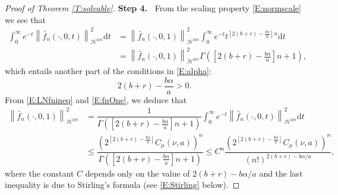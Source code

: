 \documentclass[12pt]{report}
\theoremstyle{plain}
\theoremstyle{definition}
\numberwithin{equation}{section}
\newcommand{\Norm}[1]{\left\|  #1   \right\|}
\newcommand{\ud}{\ensuremath{ \mathrm{d} }}
\begin{document}
\begin{proof}[Proof of Theorem \ref{T:solvable}]
	{\bigskip\bf\noindent Step 4.~}%
	From the scaling property \eqref{E:normscale} we see that
	\begin{align}
	\nonumber
	\int_0^\infty e^{-t} \Norm{ \widetilde{f_n}\left(\cdot,0,t\right) }_{ \mathcal{H}^{\otimes n} }^2 \ud t
	& = \Norm{ \widetilde{f_n}(\cdot,0,1) }_{ \mathcal{H}^{\otimes n} }^2 \int_0^\infty e^{-t} t^{ \left[ 2(b+r)-\frac{b \alpha}{a} \right] n } \ud t \\
	& = \Norm{ \widetilde{f_n}(\cdot,0,1) }_{ \mathcal{H}^{\otimes n} }^2 \Gamma\left( \left[ 2(b+r)- \frac{b \alpha}{a} \right] n +1 \right),
	\label{E:fnOne}
	\end{align}
	which entails another part of the conditions in \eqref{E:alpha}:
	\begin{equation} \label{E:alpha3}
	2(b+r)-\frac{b\alpha}{a} >0.
	\end{equation}
	From \eqref{E:LNfnineq} and \eqref{E:fnOne}, we deduce that
	\begin{align*}
	\Norm{ \widetilde{f_n}(\cdot,0,1) }_{ \mathcal{H}^{\otimes n} }^2
	& = \dfrac{1}{ \Gamma\left( \left[ 2(b+r)- \frac{b \alpha}{a} \right] n +1 \right) }  \int_0^\infty e^{-t} \Norm{ \widetilde{f_n}(\cdot,0,t) }_{ \mathcal{H}^{\otimes n} }^2 \ud t \\
	& \le \dfrac{ \left(2^{ \left[ 2(b+r)- \frac{b \alpha}{a} \right]}C_\mu(\nu, a) \right)^n }{\Gamma\left( \left[ 2(b+r)- \frac{b \alpha}{a} \right] n +1 \right) }
	\le C^n \dfrac{ \left(2^{ \left[ 2(b+r)- \frac{b \alpha}{a} \right]}C_\mu(\nu,a) \right)^n }{ (n!)^{ 2(b+r) - b\alpha/a }},
	\end{align*}
	where the constant $C$ depends only on the value of $2(b+r)-b\alpha/a$ and the last inequality is
	due to Stirling's formula (see \eqref{E:Stirling} below).
	

\end{proof}
\end{document}
